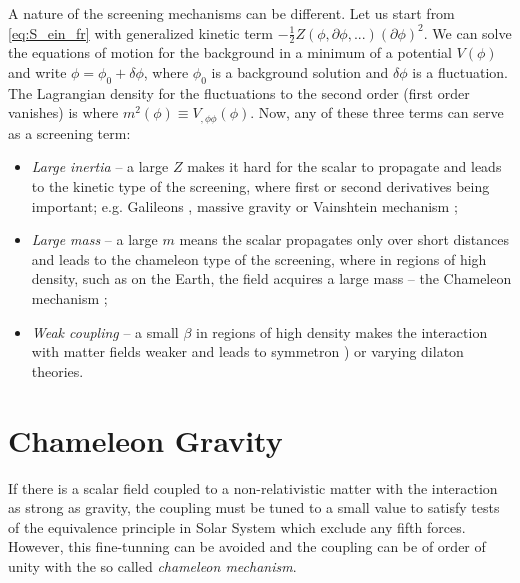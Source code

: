 A nature of the screening mechanisms can be different. Let us start from \eqref{eq:S_ein_fr} with generalized kinetic term $-\frac12 Z(\phi,\partial\phi,...)(\partial\phi)^2$. We can solve the equations of motion for the background in a minimum of a potential $V(\phi)$ and write $\phi=\phi_0+\delta\phi$, where $\phi_0$ is a background solution and $\delta\phi$ is a fluctuation. The Lagrangian density for the fluctuations to the second order (first order vanishes) is
where $m^2(\phi)\equiv V_{,\phi\phi}(\phi)$. Now, any of these three terms can serve as a screening term:
\begin{itemize}
	\item  \textit{Large inertia} -- a large $Z$ makes it hard for the scalar to propagate and leads to the kinetic type of the screening, where first or second derivatives being important; e.g. Galileons \parencite{2009PhRvD..79f4036N}, massive gravity \parencite{2012RvMP...84..671H} or Vainshtein mechanism \parencite{2013CQGra..30r4001B};
	\item \textit{Large mass} --  a large $m$ means the scalar propagates only over short distances and leads to the chameleon type of the screening, where in regions of high density, such as on the Earth, the field acquires a large mass -- the Chameleon mechanism \parencite{Waterhouse:2006wv};
	\item \textit{Weak coupling} -- a small $\beta$ in regions of high density makes the interaction with matter fields weaker and leads to symmetron \parencite{2010PhRvL.104w1301H}) or varying dilaton \parencite{Damour:1994zq,2011PhRvD..83j4026B} theories.
\end{itemize}
\section{Chameleon Gravity}
\label{sec_cham}
If there is a scalar field coupled to a non-relativistic matter with the interaction as strong as gravity, the coupling must be tuned to a small value to satisfy tests of the equivalence principle in Solar System which exclude any fifth forces. However, this fine-tunning can be avoided and the coupling can be of order of unity with the so called \textit{chameleon mechanism}.

